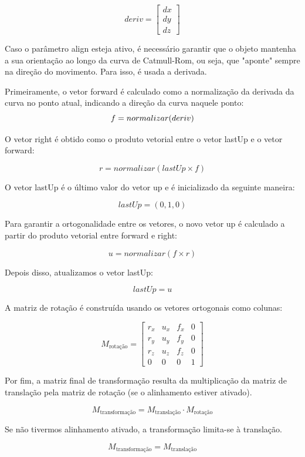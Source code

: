\documentclass[12pt, a4paper]{article}
\begin{document}
\[
{deriv} = \begin{bmatrix} dx \\ dy \\ dz \end{bmatrix}
\]

Caso o parâmetro align esteja ativo, é necessário garantir que o objeto mantenha a sua
orientação ao longo da curva de Catmull-Rom, ou seja, que "aponte" sempre na direção do
movimento. Para isso, é usada a derivada.

Primeiramente, o vetor forward é calculado como a normalização da derivada da curva no
ponto atual, indicando a direção da curva naquele ponto:
$$
f = normalizar(deriv) \\
$$

O vetor right é obtido como o produto vetorial entre o vetor lastUp e o vetor forward:

$$
r = normalizar(lastUp \times f)
$$

O vetor lastUp é o último valor do vetor up e é inicializado da seguinte maneira:

$$
lastUp=(0,1,0)
$$

Para garantir a ortogonalidade entre os vetores, o novo vetor up é calculado a
partir do produto vetorial entre forward e right:

$$
u = normalizar(f \times r)
$$

Depois disso, atualizamos o vetor lastUp:

$$
lastUp = u
$$

A matriz de rotação é construída usando os vetores ortogonais como colunas:

$$
M_{\text{rotação}} =
\begin{bmatrix}
    r_x & u_x   & f_x & 0 \\
    r_y  & u_y & f_y & 0 \\
    r_z & u_z  & f_z  & 0 \\
    0  & 0 & 0    & 1
\end{bmatrix}
$$

Por fim, a matriz
final de transformação resulta da multiplicação da matriz de translação pela matriz de
rotação (se o alinhamento estiver ativado).

$$
M_{\text{transformação}} = M_{\text{translação}} \cdot M_{\text{rotação}}
$$

Se não tivermos alinhamento ativado, a transformação limita-se à translação.

$$
M_{\text{transformação}} = M_{\text{translação}}
$$
\end{document}
